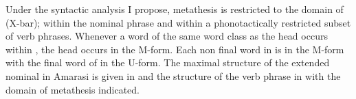 \begin{exe}
	\label{ex:130825-6, 0.36 3}
	\label{ex:130925-1, 3.32}
\end{exe}
\begin{multicols}{2}
	\begin{exe}
		\label{tr:130925-1, 3.32}
		\label{tr:130825-6, 0.36 3}
	\end{exe}
\end{multicols}

Under the syntactic analysis I propose, metathesis is restricted
to the domain of  (X-bar);  within the nominal phrase
and  within a phonotactically restricted subset of verb phrases.
Whenever a word of the same word class as the head occurs within ,
the head occurs in the M-form.
Each non final word in  is in the M-form
with the final word of  in the U-form.
The maximal structure of the extended nominal in Amarasi is given in 
and the structure of the verb phrase in 
with the domain of metathesis indicated.

